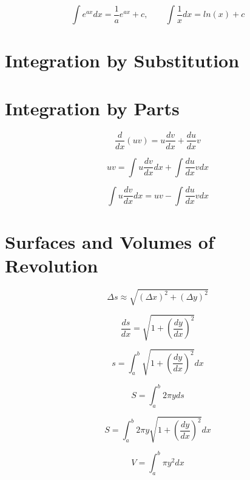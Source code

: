 \[\int e^{ax}dx = \frac{1}{a}e^{ax} + c, \qquad \int \frac{1}{x}dx = ln(x) + c\]

\section{Integration by Substitution}
\section{Integration by Parts}

\begin{equation*}
    \frac{d}{dx}(uv) = u \frac{dv}{dx} + \frac{du}{dx} v
\end{equation*}

\begin{equation*}
    uv = \int u \frac{dv}{dx} dx + \int \frac{du}{dx}vdx
\end{equation*}
    
\begin{equation*}
    \int u \frac{dv}{dx} dx = uv - \int \frac{du}{dx}vdx
\end{equation*}

\section{Surfaces and Volumes of Revolution}

\begin{equation*}
    \Delta s \approx \sqrt{(\Delta x)^{2} + (\Delta y)^{2}}
\end{equation*}

\begin{equation*}
    \frac{ds}{dx} = \sqrt{1 + \left(\frac{dy}{dx}\right)^2}
\end{equation*}

\begin{equation*}
    s = \int_{a}^{b}\sqrt{1 + \left(\frac{dy}{dx}\right)^{2}}dx
\end{equation*}

\begin{equation*}
    S = \int_{a}^{b} 2 \pi y ds
\end{equation*}

\begin{equation*}
    S = \int_{a}^{b} 2 \pi y \sqrt{1 + \left(\frac{dy}{dx}\right)^{2}}dx
\end{equation*}

\begin{equation*}
    V = \int_{a}^{b} \pi y^{2} dx
\end{equation*}

